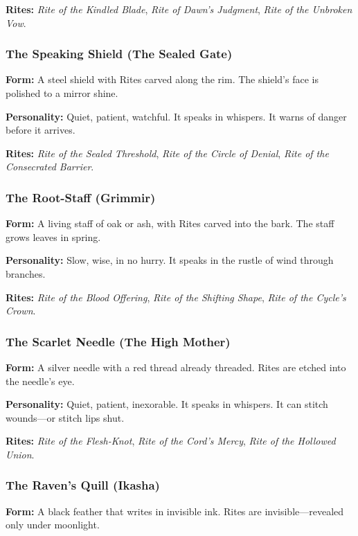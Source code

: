 \textbf{Rites:} \textit{Rite of the Kindled Blade}, \textit{Rite of Dawn's Judgment}, \textit{Rite of the Unbroken Vow}.

\subsubsection{The Speaking Shield (The Sealed Gate)}

\textbf{Form:} A steel shield with Rites carved along the rim. The shield's face is polished to a mirror shine.

\textbf{Personality:} Quiet, patient, watchful. It speaks in whispers. It warns of danger before it arrives.

\textbf{Rites:} \textit{Rite of the Sealed Threshold}, \textit{Rite of the Circle of Denial}, \textit{Rite of the Consecrated Barrier}.

\subsubsection{The Root-Staff (Grimmir)}

\textbf{Form:} A living staff of oak or ash, with Rites carved into the bark. The staff grows leaves in spring.

\textbf{Personality:} Slow, wise, in no hurry. It speaks in the rustle of wind through branches.

\textbf{Rites:} \textit{Rite of the Blood Offering}, \textit{Rite of the Shifting Shape}, \textit{Rite of the Cycle's Crown}.

\subsubsection{The Scarlet Needle (The High Mother)}

\textbf{Form:} A silver needle with a red thread already threaded. Rites are etched into the needle's eye.

\textbf{Personality:} Quiet, patient, inexorable. It speaks in whispers. It can stitch wounds—or stitch lips shut.

\textbf{Rites:} \textit{Rite of the Flesh-Knot}, \textit{Rite of the Cord's Mercy}, \textit{Rite of the Hollowed Union}.

\subsubsection{The Raven's Quill (Ikasha)}

\textbf{Form:} A black feather that writes in invisible ink. Rites are invisible—revealed only under moonlight.

